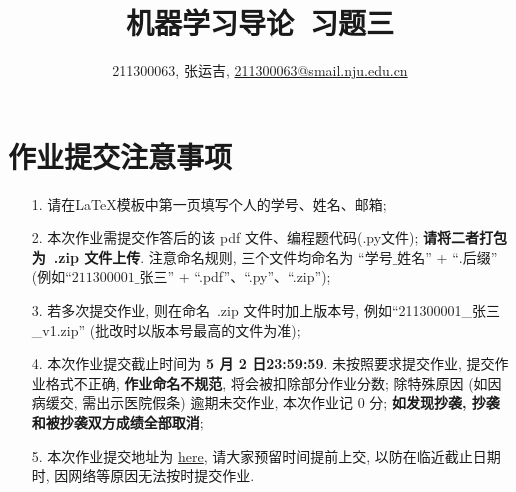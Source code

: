 \documentclass[a4paper,UTF8]{article}
\numberwithin{equation}{section}
\theoremstyle{definition}
\begin{document}
\title{机器学习导论\ 习题三}
\author{211300063, 张运吉, \href{mailto:邮箱}{211300063@smail.nju.edu.cn}}
\maketitle
\section*{作业提交注意事项}
\begin{tcolorbox}
	\begin{enumerate}
		\item[1.] 请在LaTeX模板中第一页填写个人的学号、姓名、邮箱;
		\item[2.] 本次作业需提交作答后的该 pdf 文件、编程题代码(.py文件); {\color{red}\textbf{请将二者打包为~.zip 文件上传}}. 注意命名规则, 三个文件均命名为 “$\text{学号}\_\text{姓名}$” + “$.\text{后缀}$” (例如“$\text{211300001}\_\text{张三}$” + “.pdf”、“.py”、“.zip”);
		\item[3.] 若多次提交作业, 则在命名~.zip 文件时加上版本号, 例如“211300001\_张三\_v1.zip” (批改时以版本号最高的文件为准);
		\item[4.] 本次作业提交截止时间为 {\color{red}\textbf{ 5 月 2 日23:59:59}}. 未按照要求提交作业, 提交作业格式不正确, {\color{red}\textbf{作业命名不规范}}, 将会被扣除部分作业分数; 除特殊原因 (如因病缓交, 需出示医院假条) 逾期未交作业, 本次作业记 0 分; {\color{red}\textbf{如发现抄袭, 抄袭和被抄袭双方成绩全部取消}};
		\item[5.] 本次作业提交地址为 \href{https://box.nju.edu.cn/u/d/71102ced9a9b4d6f8d05/}{here}, 请大家预留时间提前上交, 以防在临近截止日期时, 因网络等原因无法按时提交作业.
	\end{enumerate}
\end{tcolorbox}
\newpage
\end{document}
